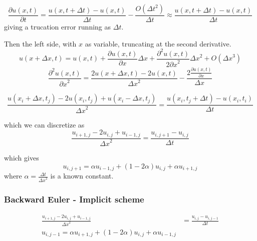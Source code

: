 \documentclass[10pt,a4paper]{article}
\newcommand{\dt}{{\Delta t}}
\newcommand{\dx}{{\Delta x}}
\newcommand{\pt}{{\partial t}}
\newcommand{\px}{{\partial x}}
\newcommand{\pu}{{\partial u}}
\newcommand{\ppu}{{\partial^2 u}}
\begin{document}
\begin{equation}
\frac{\pu(x,t)}{\pt} = \frac{u(x,t+\dt) - u(x,t)}{\dt} - \frac{O(\dt^2)}{\dt} \approx \frac{u(x,t+\dt) - u(x,t)}{\dt}
\end{equation}
giving a trucation error running as $\dt$.

Then the left side, with $x$ as variable, truncating at the second derivative.
\begin{equation}
u(x+\Delta x, t) = u(x,t) + \frac{\pu(x,t)}{\px}\dx + \frac{\ppu(x,t)}{2\px^2}\dx^2 + O(\dx^3)
\end{equation}
\begin{equation}
\frac{\ppu(x,t)}{\px^2} = \frac{2u(x+\dx,t) - 2u(x,t)}{\dx^2} - \frac{2\frac{\pu(x,t)}{\px}}{\dx}
\end{equation}

\begin{equation}
\frac{u(x_i + \dx, t_j) - 2u(x_i,t_j) + u(x_i - \dx, t_j)}{\dx^2}
= \frac{u(x_i, t_j + \dt) - u(x_i, t_i)}{\dt}
\end{equation}

which we can discretize as
\begin{equation}
\frac{u_{i+1,j} - 2u_{i,j}+u_{i-1,j}}{\dx^2} = \frac{u_{i,j+1} - u_{i,j}}{\dt}
\end{equation}

which gives
\begin{equation}
u_{i,j+1} = \alpha u_{i-1,j} + (1-2\alpha)u_{i,j} + \alpha u_{i+1,j}
\end{equation}
where $\alpha = \frac{\dt}{\dx^2}$ is a known constant.


\subsubsection{Backward Euler - Implicit scheme}
\begin{align}
\frac{u_{i+1,j} - 2u_{i,j}+u_{i-1,j}}{\dx^2} &= \frac{u_{i,j} - u_{i,j-1}}{\dt} \\
u_{i,j-1} = \alpha u_{i+1,j} + (1 - 2\alpha )u_{i,j} + \alpha u_{i-1,j}
\end{align}
\end{document}
